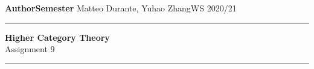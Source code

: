 \documentclass[a4paper,11pt,openany]{scrartcl}
\begin{document}
\noindent\textbf{Author}\hfill\textbf{Semester} \linebreak
\vspace*{-.1cm} Matteo Durante, Yuhao Zhang\hfill WS 2020/21 \\

\noindent
\rule{\linewidth}{1pt}
\begin{center}
\Large
\textbf{Higher Category Theory} \\
Assignment 9
\end{center}
\rule{\linewidth}{1pt}
\\


\newcommand{\La}{\Lambda}
\newcommand{\pa}{\partial}
\newcommand{\ob}{\operatorname{Ob}}
\newcommand{\mor}{\operatorname{Mor}}
\newcommand{\sto}{\twoheadrightarrow}

\newcommand{\plim}{\varprojlim}
\newcommand{\sst}{\subseteq}
\newcommand{\eq}{\operatorname{eq}}

\newcommand{\f}{\varphi}

\newcommand{\sing}{\operatorname{Sing}}

\newcommand{\ihom}{\underline{\Hom}}
\end{document}
